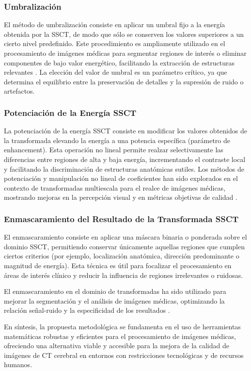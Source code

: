 \subsubsection{Umbralización}

El método de umbralización consiste en aplicar un umbral fijo a la energía obtenida por la SSCT, de modo que sólo se conserven los valores superiores a un cierto nivel predefinido. Este procedimiento es ampliamente utilizado en el procesamiento de imágenes médicas para segmentar regiones de interés o eliminar componentes de bajo valor energético, facilitando la extracción de estructuras relevantes \cite{zhao2023thresholding, pmc6132127}. La elección del valor de umbral es un parámetro crítico, ya que determina el equilibrio entre la preservación de detalles y la supresión de ruido o artefactos.

\subsubsection{Potenciación de la Energía SSCT}

La potenciación de la energía SSCT consiste en modificar los valores obtenidos de la transformada elevando la energía a una potencia específica (parámetro de enhancement). Esta operación no lineal permite realzar selectivamente las diferencias entre regiones de alta y baja energía, incrementando el contraste local y facilitando la discriminación de estructuras anatómicas sutiles. Los métodos de potenciación y manipulación no lineal de coeficientes han sido explorados en el contexto de transformadas multiescala para el realce de imágenes médicas, mostrando mejoras en la percepción visual y en métricas objetivas de calidad \cite{SynchrosqueezedCurveletTransform, EnergyEnhancement}.

\subsubsection{Enmascaramiento del Resultado de la Transformada SSCT}

El enmascaramiento consiste en aplicar una máscara binaria o ponderada sobre el dominio SSCT, permitiendo conservar únicamente aquellas regiones que cumplen ciertos criterios (por ejemplo, localización anatómica, dirección predominante o magnitud de energía). Esta técnica es útil para focalizar el procesamiento en áreas de interés clínico y reducir la influencia de regiones irrelevantes o ruidosas.

El enmascaramiento en el dominio de transformadas ha sido utilizado para mejorar la segmentación y el análisis de imágenes médicas, optimizando la relación señal-ruido y la especificidad de los resultados \cite{SynchrosqueezedCurveletTransform,ImageMaskingBook}.

\vspace{0.5cm}

En síntesis, la propuesta metodológica se fundamenta en el uso de herramientas matemáticas robustas y eficientes para el procesamiento de imágenes médicas, ofreciendo una alternativa viable y accesible para la mejora de la calidad de imágenes de CT cerebral en entornos con restricciones tecnológicas y de recursos humanos.
